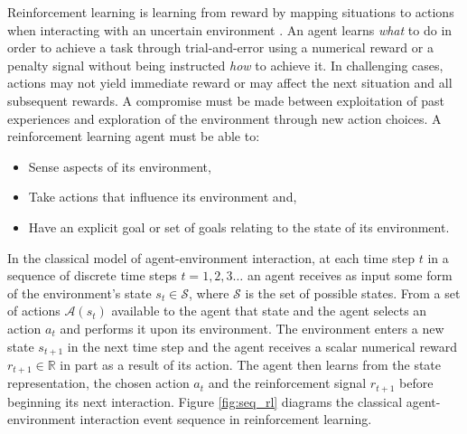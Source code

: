 Reinforcement learning is learning from reward by mapping situations to actions
when interacting with an uncertain environment \cite{suttonbarto:1998}.  An
agent learns \textit{what} to do in order to achieve a task through
trial-and-error using a numerical reward or a penalty signal without being
instructed \textit{how} to achieve it.  In challenging cases, actions may not
yield immediate reward or may affect the next situation and all subsequent
rewards.  A compromise must be made between exploitation of past experiences
and exploration of the environment through new action choices.  A
reinforcement learning agent must be able to:
\begin{itemize}
  \item Sense aspects of its environment,
  \item Take actions that influence its environment and,
  \item Have an explicit goal or set of goals relating to the state of its
  environment.
\end{itemize}
In the classical model of agent-environment interaction, at each time step $t$
in a sequence of discrete time steps $t = 1,2,3\dotsc$ an agent receives as
input some form of the environment's state $s_t \in \mathscr{S}$, where
$\mathscr{S}$ is the set of possible states.  From a set of actions
$\mathscr{A}(s_t)$ available to the agent that state and the agent selects
an action $a_t$ and performs it upon its environment.  The environment enters a
new state $s_{t+1}$ in the next time step and the agent receives a scalar
numerical reward $r_{t+1} \in \mathbb{R}$ in part as a result of its action.
The agent then learns from the state representation, the
chosen action $a_t$ and the reinforcement signal $r_{t+1}$ before beginning
its next interaction.  Figure \ref{fig:seq_rl} diagrams the classical
agent-environment interaction event sequence in reinforcement learning.


